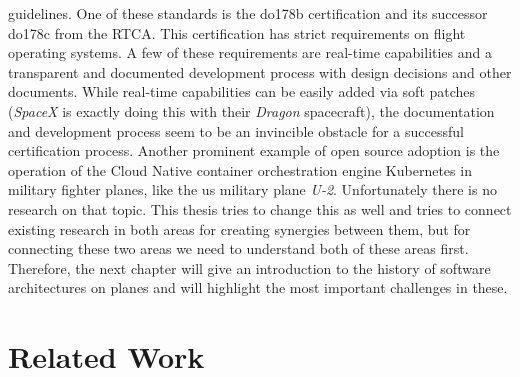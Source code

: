 \documentclass[titlepage]{report}
\begin{document}
guidelines. One of these standards is the \gls{do178b} certification and its successor \gls{do178c} from the \gls{RTCA}. 
This certification has strict requirements on flight operating systems. A few of these requirements are real-time capabilities
and a transparent and documented development process with design decisions and other documents. While
real-time capabilities can be easily added via soft patches (\emph{SpaceX} is exactly doing this with their
\emph{Dragon} spacecraft\cite{gruen2012linux}), the documentation and development process seem to be an invincible
obstacle for a successful certification process. Another prominent example of open source adoption is the operation
of the Cloud Native container orchestration engine Kubernetes in military fighter planes, like the \gls{us} military
plane \emph{U-2}\cite{U2Kubernetes}. Unfortunately there is no research on that topic. This thesis tries to change this
as well and tries to connect existing research in both areas for creating synergies between them, but for connecting
these two areas we need to understand both of these areas first. 
Therefore, the next chapter will give an introduction to the history of software architectures on planes and will highlight the 
most important challenges in these.

\chapter{Related Work}\label{chapter:related_work}
\end{document}
